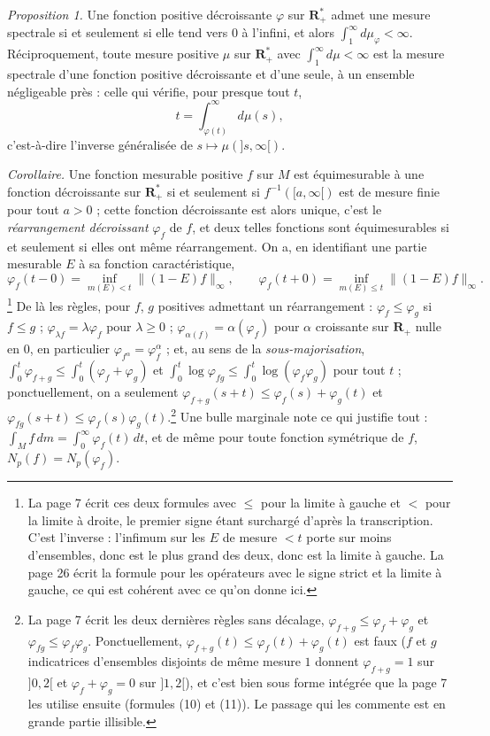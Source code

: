\documentclass[11pt,a4paper]{article}
\begin{document}
\emph{Proposition 1.} Une fonction positive décroissante $\varphi$ sur
$\mathbf{R}^{*}_{+}$ admet une mesure spectrale si et seulement si elle tend
vers $0$ à l'infini, et alors $\int_1^\infty d\mu_\varphi < \infty$.
Réciproquement, toute mesure positive $\mu$ sur $\mathbf{R}^{*}_{+}$ avec
$\int_1^\infty d\mu < \infty$ est la mesure spectrale d'une fonction positive
décroissante et d'une seule, à un ensemble négligeable près : celle qui
vérifie, pour presque tout $t$,
\[
  t = \int_{\varphi(t)}^{\infty} d\mu(s),
\]
c'est-à-dire l'inverse généralisée de $s \mapsto \mu(]s,\infty[)$.

\emph{Corollaire.} Une fonction mesurable positive $f$ sur $M$ est
équimesurable à une fonction décroissante sur $\mathbf{R}^{*}_{+}$ si et
seulement si $f^{-1}([a,\infty[)$ est de mesure finie pour tout $a > 0$ ;
cette fonction décroissante est alors unique, c'est le \emph{réarrangement
décroissant} $\varphi_f$ de $f$, et deux telles fonctions sont équimesurables
si et seulement si elles ont même réarrangement. On a, en identifiant une
partie mesurable $E$ à sa fonction caractéristique,
\[
  \varphi_f(t{-}0) = \inf_{m(E) < t} \|(1-E)f\|_\infty, \qquad
  \varphi_f(t{+}0) = \inf_{m(E) \leq t} \|(1-E)f\|_\infty .
\]
\footnote{La page 7 écrit ces deux formules avec $\leq$ pour la limite à
gauche et $<$ pour la limite à droite, le premier signe étant surchargé
d'après la transcription. C'est l'inverse : l'infimum sur les $E$ de mesure
$< t$ porte sur moins d'ensembles, donc est le plus grand des deux, donc
est la limite à gauche. La page 26 écrit la formule pour les opérateurs avec
le signe strict et la limite à gauche, ce qui est cohérent avec ce qu'on
donne ici.}
De là les règles, pour $f$, $g$ positives admettant un réarrangement :
$\varphi_f \leq \varphi_g$ si $f \leq g$ ; $\varphi_{\lambda f} =
\lambda\varphi_f$ pour $\lambda \geq 0$ ; $\varphi_{\alpha(f)} =
\alpha(\varphi_f)$ pour $\alpha$ croissante sur $\mathbf{R}_{+}$ nulle en
$0$, en particulier $\varphi_{f^\alpha} = \varphi_f^\alpha$ ;
et, au sens de la \emph{sous-majorisation},
$\int_0^t \varphi_{f+g} \leq \int_0^t (\varphi_f + \varphi_g)$ et
$\int_0^t \log\varphi_{fg} \leq \int_0^t \log(\varphi_f\varphi_g)$ pour
tout $t$ ; ponctuellement, on a seulement $\varphi_{f+g}(s+t) \leq
\varphi_f(s) + \varphi_g(t)$ et $\varphi_{fg}(s+t) \leq
\varphi_f(s)\varphi_g(t)$.\footnote{La page 7 écrit les deux dernières
règles sans décalage, $\varphi_{f+g} \leq \varphi_f + \varphi_g$ et
$\varphi_{fg} \leq \varphi_f\varphi_g$. Ponctuellement, $\varphi_{f+g}(t)
\leq \varphi_f(t) + \varphi_g(t)$ est faux ($f$ et $g$ indicatrices d'ensembles disjoints de même mesure $1$
donnent $\varphi_{f+g} = 1$ sur $]0,2[$ et $\varphi_f + \varphi_g = 0$ sur
$]1,2[$), et c'est bien sous forme intégrée que la page 7 les utilise
ensuite (formules (10) et (11)). Le passage qui les commente est en grande
partie illisible.} Une bulle marginale note ce qui justifie tout : $\int_M
f\,dm = \int_0^\infty \varphi_f(t)\,dt$, et de même pour toute fonction
symétrique de $f$, $N_p(f) = N_p(\varphi_f)$.
\end{document}
